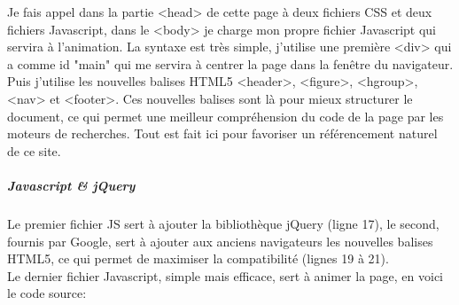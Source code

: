 \documentclass[11pt,a4paper,twoside]{report}
\begin{document}
					Je fais appel dans la partie <head> de cette page à deux fichiers CSS et deux fichiers Javascript, dans le <body> je charge mon propre fichier Javascript qui servira à l'animation. La syntaxe est très simple, j'utilise une première <div> qui a comme id "main" qui me servira à centrer la page dans la fenêtre du navigateur. Puis j'utilise les nouvelles balises HTML5 <header>, <figure>, <hgroup>, <nav> et <footer>. Ces nouvelles balises sont là pour mieux structurer le document, ce qui permet une meilleur compréhension du code de la page par les moteurs de recherches. Tout est fait ici pour favoriser un référencement naturel de ce site.

				\subparagraph{Javascript \& jQuery}Le premier fichier JS sert à ajouter la bibliothèque jQuery (ligne 17), le second, fournis par Google, sert à ajouter aux anciens navigateurs les nouvelles balises HTML5, ce qui permet de maximiser la compatibilité (lignes 19 à 21).\\
				Le dernier fichier Javascript, simple mais efficace, sert à animer la page, en voici le code source:
\end{document}
